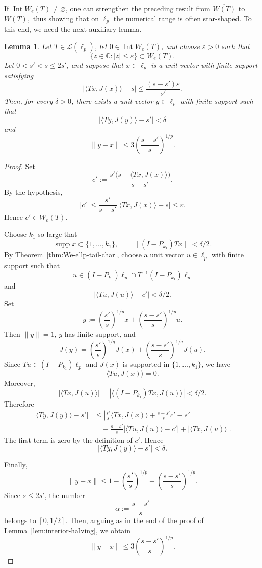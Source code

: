 \documentclass[11pt]{amsart}
\numberwithin{equation}{section}
\newtheorem{lemma}[theorem]{Lemma}
\theoremstyle{definition}
\theoremstyle{remark}
\DeclareMathOperator{\Int}{Int}
\newcommand{\We}{W_e}
\begin{document}
If $\Int \We(T)\ne \varnothing$, one can strengthen the preceding result from $\overline{W(T)}$ to $W(T),$
  thus showing that on \(\ell_p\) the numerical range is often star-shaped. To this end, we need the next auxiliary lemma.



\begin{lemma}\label{lem:preiterate}
Let \(T\in \mathcal L(\ell_p)\), let
\(0\in \operatorname{Int} W_e(T)\), and choose \(\varepsilon>0\) such that
\[
        \{z\in\mathbb C: |z|\le \varepsilon\}\subset W_e(T).
\]
Let \(0<s'<s\le 2s'\), and suppose that \(x\in\ell_p\) is a unit vector
with finite support satisfying
\[
        |\langle Tx,J(x)\rangle-s|
        \le
        \frac{(s-s')\varepsilon}{s'} .
\]
Then, for every \(\delta>0\), there exists a unit vector \(y\in\ell_p\) with
finite support such that
\[
        |\langle Ty,J(y)\rangle-s'|<\delta
\]
and
\[
        \|y-x\|
        \le
        3\left(\frac{s-s'}s\right)^{1/p}.
\]
\end{lemma}
\begin{proof}
Set
\[
        c':=
        \frac{s'\bigl(s-\langle Tx,J(x)\rangle\bigr)}{s-s'} .
\]
By the hypothesis,
\[
        |c'|
        \le
        \frac{s'}{s-s'}|\langle Tx,J(x)\rangle-s|
        \le \varepsilon .
\]
Hence \(c'\in W_e(T)\).

Choose \(k_1\) so large that
\[
        \operatorname{supp}x\subset\{1,\ldots,k_1\},
        \qquad
        \|(I-P_{k_1})Tx\|<\delta/2 .
\]
By Theorem~\ref{thm:We-ellp-tail-char}, choose a unit vector \(u\in\ell_p\) with finite support such that
\[
        u\in (I-P_{k_1})\ell_p\cap T^{-1}(I-P_{k_1})\ell_p
\]
and
\[
        |\langle Tu,J(u)\rangle-c'|<\delta/2 .
\]
Set
\[
        y:=
        \left(\frac{s'}s\right)^{1/p}x+
        \left(\frac{s-s'}s\right)^{1/p}u .
\]
Then \(\|y\|=1\), \(y\) has finite support, and
\[
        J(y)=
        \left(\frac{s'}s\right)^{1/q}J(x)+
        \left(\frac{s-s'}s\right)^{1/q}J(u).
\]
Since \(Tu\in (I-P_{k_1})\ell_p\) and \(J(x)\) is supported in
\(\{1,\ldots,k_1\}\), we have
\[
        \langle Tu,J(x)\rangle=0.
\]
Moreover,
\[
        |\langle Tx,J(u)\rangle|
        =
        |\langle (I-P_{k_1})Tx,J(u)\rangle|
        <\delta/2 .
\]
Therefore
\[
\begin{aligned}
        |\langle Ty,J(y)\rangle-s'|
        &\le
        \left|
        \frac{s'}s\langle Tx,J(x)\rangle
        +\frac{s-s'}s c'-s'
        \right|                                      \\
        &\quad+
        \frac{s-s'}s
        |\langle Tu,J(u)\rangle-c'|
        +
        |\langle Tx,J(u)\rangle| .
\end{aligned}
\]
The first term is zero by the definition of \(c'\). Hence
\[
        |\langle Ty,J(y)\rangle-s'|<\delta .
\]

Finally,
\[
        \|y-x\|
        \le
        1-\left(\frac{s'}s\right)^{1/p}
        +
        \left(\frac{s-s'}s\right)^{1/p}.
\]
Since \(s\le 2s'\), the number
\[
        \alpha:=\frac{s-s'}s
\]
belongs to \([0,1/2]\). Then, arguing as in the end of the proof of Lemma~\ref{lem:interior-halving}, we obtain
\[
        \|y-x\|
        \le
        3\left(\frac{s-s'}s\right)^{1/p}.
\]
\end{proof}
\end{document}
